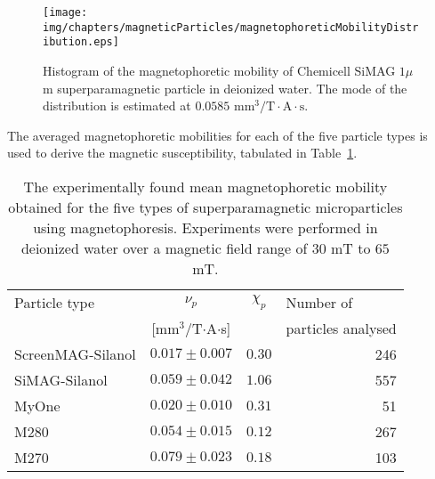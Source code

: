 \begin{figure}[htb]
   \centering
   \texttt{[image: img/chapters/magneticParticles/magnetophoreticMobilityDistribution.eps]}
   \caption[Histogram of magnetophoretic mobility of $1$ $\mu$m sized Chemicell SiMAG particles]{Histogram of the magnetophoretic mobility of Chemicell SiMAG $1 \mu$m superparamagnetic particle in deionized water. The mode of the distribution is estimated at $0.0585$ $\text{mm}^{3}/\text{T}\cdot\text{A}\cdot\text{s}$.}
   \label{img:magnetophoreticMobilityDistribution}
\end{figure}

The averaged magnetophoretic mobilities for each of the five particle types is used to derive the magnetic susceptibility, tabulated in Table~\ref{tab:particleMobility}.

\begin{table}[htb]
\begin{center}
\caption[Experimentally found magnetophoretic mobility and susceptibility of superparamagnetic particles using magnetophoresis]{The experimentally found mean magnetophoretic mobility obtained for the five types of superparamagnetic microparticles using magnetophoresis. Experiments were performed in deionized water over a magnetic field range of $30$ mT to $65$ mT.}\vspace{1ex}
\label{tab:particleMobility}
\begin{tabular}{lccr}\hline
Particle type 		& $\nu_{p}$ & $\chi_{p}$  & \multicolumn{1}{l}{Number of} \\ 
					& [mm$^3$/T$\cdot$A$\cdot$s] & & \multicolumn{1}{l}{particles analysed} \\ \hline
ScreenMAG-Silanol 	& $0.017\pm 0.007$ & $0.30$ & 246 \\
SiMAG-Silanol 		& $0.059\pm 0.042$ & $1.06$ & 557 \\
MyOne 	 			& $0.020\pm 0.010$ & $0.31$ & 51 \\
M280 				& $0.054\pm 0.015$ & $0.12$ & 267 \\
M270 				& $0.079\pm 0.023$ & $0.18$ & 103 \\ \hline
\end{tabular}
\end{center}
\end{table}

